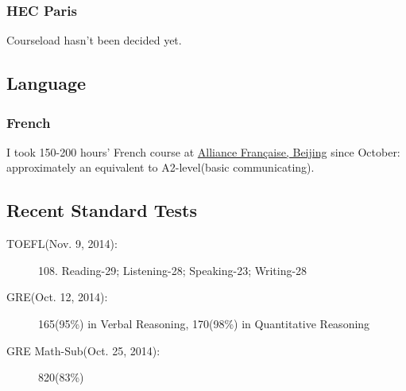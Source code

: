 \documentclass{article}
\begin{document}
\subsubsection{HEC Paris}
Courseload hasn't been decided yet.

\subsection{Language}
\subsubsection{French}
I took 150-200 hours' French course at \href{http://www.alliancefr.org/}{Alliance Française, Beijing} since October: approximately an equivalent to A2-level(basic communicating).

\subsection{Recent Standard Tests}
\begin{description}
\item[TOEFL(Nov. 9, 2014):] 108. Reading-29; Listening-28; Speaking-23; Writing-28
\item[GRE(Oct. 12, 2014):] 165(95\%) in Verbal Reasoning, 170(98\%) in Quantitative Reasoning
\item[GRE Math-Sub(Oct. 25, 2014):] 820(83\%)
\end{description}
% 
\end{document}
